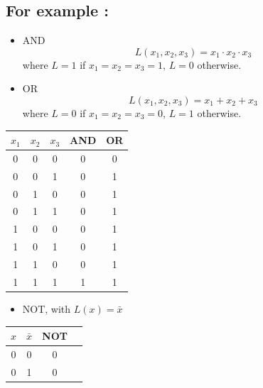 \documentclass[12pt,openany]{book}
\begin{document}
			      	\subsection*{For example :}
			      	\vspace*{-2px}
			      	\begin{itemize}
			      		\item[] AND
			      		      \vspace*{-5px}
			      		      \begin{equation*}
			      		      	L(x_1, x_2, x_3) = x_1 \cdot x_2 \cdot x_3
			      		      \end{equation*}
			      		      where \( L = 1 \) if \( x_1 = x_2 = x_3 = 1 \), \( L = 0 \) otherwise.
			      		      \vspace*{-5px}
			      		\item[] OR
			      		      \begin{equation*}
			      		      	L(x_1, x_2, x_3) = x_1 + x_2 + x_3
			      		      \end{equation*}
			      		      where \( L = 0 \) if \( x_1 = x_2 = x_3 = 0 \), \( L = 1 \) otherwise.
			      	\end{itemize}
			      	
			      	\begin{center}
			      		\begin{tabular}{ c c c | c | c }
			      			
			      			\( x_1 \) & \( x_2 \) & \( x_3 \) & AND & OR \\
			      			\hline
			      			0         & 0         & 0         & 0   & 0  \\
			      			0         & 0         & 1         & 0   & 1  \\
			      			0         & 1         & 0         & 0   & 1  \\
			      			0         & 1         & 1         & 0   & 1  \\
			      			1         & 0         & 0         & 0   & 1  \\
			      			1         & 0         & 1         & 0   & 1  \\
			      			1         & 1         & 0         & 0   & 1  \\
			      			1         & 1         & 1         & 1   & 1  \\
			      		\end{tabular}
			      	\end{center}
			      	\begin{itemize}
			      		\item[] NOT, with $L(x) = \bar{x}$      
			      	\end{itemize}
			      	\begin{center}
			      		\begin{tabular}{ c c | c | c }
			      			\( x \) & \( \bar{x} \) & NOT \\
			      			\hline
			      			0       & 0             & 0   \\
			      			0       & 1             & 0   \\
			      		\end{tabular}
			      	\end{center}
			      	
\end{document}
